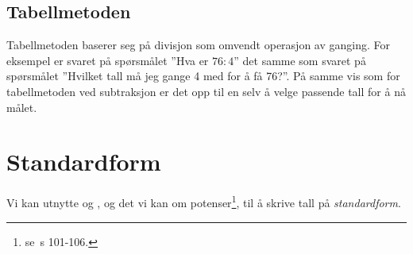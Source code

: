 \subsection{Tabellmetoden}
Tabellmetoden baserer seg på divisjon som omvendt operasjon av ganging. For eksempel er svaret på spørsmålet ''Hva er $ {76:4} $'' det samme som svaret på spørsmålet ''Hvilket tall må jeg gange 4 med for å få 76?''. På samme vis som for tabellmetoden ved subtraksjon er det opp til en selv å velge passende tall for å nå målet.
\begin{center}
	\parbox{0.35\linewidth}{
		} \qquad
\parbox{0.35\linewidth}{
	} \vsk

\parbox{0.415\linewidth}{
}
\end{center}
\section{Standardform}
Vi kan utnytte  og , og det vi kan om potenser\footnote{se \mb\,s 101-106.}, til å skrive tall på \textit{standardform}. \vsk

